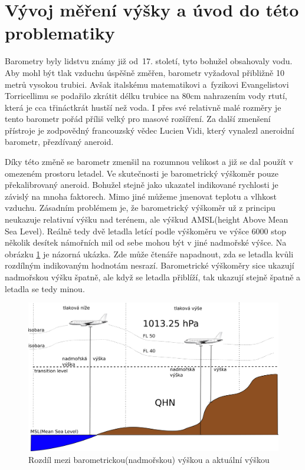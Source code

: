 		
	\section{Vývoj měření výšky a úvod do této problematiky}
	
		Barometry byly lidstvu známy již od~17. století, tyto bohužel obsahovaly vodu. Aby mohl být tlak vzduchu úspěšně změřen, barometr vyžadoval přibližně 10 metrů vysokou trubici. Avšak italskému matematikovi a~fyzikovi Evangelistovi Torricellimu se podařilo zkrátit délku trubice na 80cm nahrazením vody rtutí, která je cca třináctkrát hustší než voda. I přes své relativně malé rozměry je tento barometr pořád příliš velký pro masové rozšíření. Za další zmenšení přístroje je zodpovědný francouzský vědec Lucien Vidi, který vynalezl aneroidní barometr, přezdívaný aneroid\cite{history::aneroid}.\par
		Díky této změně se barometr zmenšil na rozumnou velikost a již se dal použít v omezeném prostoru letadel. Ve skutečnosti je barometrický výškoměr pouze překalibrovaný aneroid. Bohužel stejně jako ukazatel indikované rychlosti je závislý na mnoha faktorech. Mimo jiné můžeme jmenovat teplotu a vlhkost vzduchu. Zásadním problémem je, že barometrický výškoměr už z principu neukazuje relativní výšku nad terénem, ale výškud AMSL(height Above Mean Sea Level). Reálně tedy dvě letadla letící podle výškoměru ve výšce 6000 stop několik desítek námořních mil od sebe mohou být v jiné nadmořské výšce. Na obrázku \ref{historie::vyvojMereniVysky::FL} je názorná ukázka. Zde může čtenáře napadnout, zda se letadla kvůli rozdílným indikovaným hodnotám nesrazí. Barometrické výškoměry sice ukazují nadmořskou výšku špatně, ale když se letadla přiblíží, tak ukazují stejně špatně a letadla se tedy minou.\par
		
		\begin{figure}[H]
			\begin{center}
				\includegraphics[scale=0.75]{obrazky-figures/flight_level.png}
				\caption{Rozdíl mezi barometrickou(nadmořskou) výškou a aktuální výškou}\label{historie::vyvojMereniVysky::FL}
			\end{center}
		\end{figure}
				
